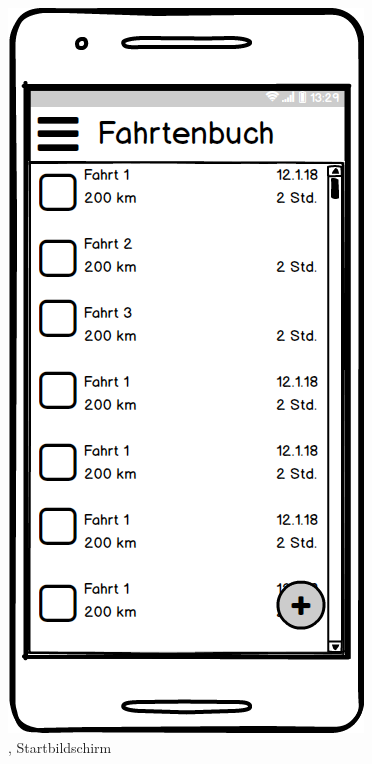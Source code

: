 \documentclass[a4paper]{article}
\begin{document}
\begin{figure}
	\begin{minipage}[b]{0.3\textwidth}
        \includegraphics[width=\textwidth]{img/mock1}
        \caption{\label{img:img/mock1}, Startbildschirm}

\end{minipage}
\end{figure}
\end{document}
